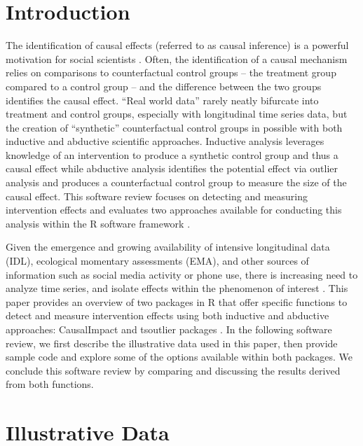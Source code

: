 \documentclass[12pt]{article}
\begin{document}
\hypertarget{introduction}{%
\section{Introduction}\label{introduction}}

The identification of causal effects (referred to as causal inference)
is a powerful motivation for social scientists
\citep{pearl2009causality}. Often, the identification of a causal
mechanism relies on comparisons to counterfactual control groups -- the
treatment group compared to a control group -- and the difference
between the two groups identifies the causal effect. ``Real world data''
rarely neatly bifurcate into treatment and control groups, especially
with longitudinal time series data, but the creation of ``synthetic''
counterfactual control groups in possible with both inductive and
abductive scientific approaches. Inductive analysis leverages knowledge
of an intervention to produce a synthetic control group and thus a
causal effect while abductive analysis identifies the potential effect
via outlier analysis and produces a counterfactual control group to
measure the size of the causal effect. This software review focuses on
detecting and measuring intervention effects and evaluates two
approaches available for conducting this analysis within the R software
framework \citep{rcore}.

Given the emergence and growing availability of intensive longitudinal
data (IDL), ecological momentary assessments (EMA), and other sources of
information such as social media activity or phone use, there is
increasing need to analyze time series, and isolate effects within the
phenomenon of interest \citep{McNeish, ram_screenomics_2020}. This paper
provides an overview of two packages in R that offer specific functions
to detect and measure intervention effects using both inductive and
abductive approaches: \textsf{CausalImpact}
\citep{brodersen2015inferring} and \textsf{tsoutlier} packages
\citep{tsoutliers}. In the following software review, we first describe
the illustrative data used in this paper, then provide sample code and
explore some of the options available within both packages. We conclude
this software review by comparing and discussing the results derived
from both functions.

\hypertarget{illustrative-data}{%
\section{Illustrative Data}\label{illustrative-data}}
\end{document}
